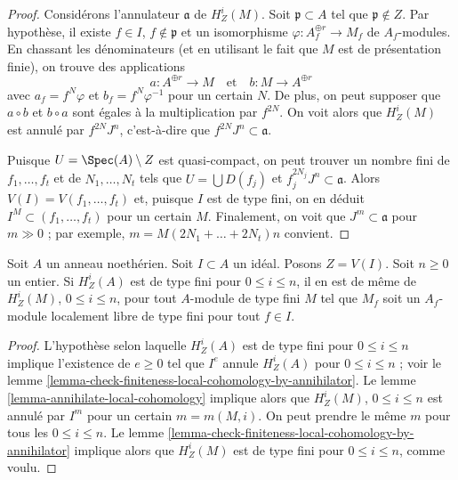 \begin{proof}
Considérons l'annulateur $\mathfrak a$ de $H^i_Z(M)$. Soit $\mathfrak p \subset A$ tel que $\mathfrak p \not \in Z$. Par hypothèse, il existe $f \in I$, $f \not \in \mathfrak p$ et un isomorphisme $\varphi : A_f^{\oplus r} \to M_f$ de $A_f$-modules. En chassant les dénominateurs (et en utilisant le fait que $M$ est de présentation finie), on trouve des applications
$$
a : A^{\oplus r} \longrightarrow M
\quad\text{et}\quad
b : M \longrightarrow A^{\oplus r}
$$
avec $a_f = f^N \varphi$ et $b_f = f^N \varphi^{-1}$ pour un certain $N$. De plus, on peut supposer que $a \circ b$ et $b \circ a$ sont égales à la multiplication par $f^{2N}$. On voit alors que $H^i_Z(M)$ est annulé par $f^{2N}J^n$, c'est-à-dire que $f^{2N}J^n \subset \mathfrak a$.

\medskip\noindent
Puisque $U = \Spec(A) \setminus Z$ est quasi-compact, on peut trouver un nombre fini de $f_1, \ldots, f_t$ et de $N_1, \ldots, N_t$ tels que $U = \bigcup D(f_j)$ et $f_j^{2N_j}J^n \subset \mathfrak a$. Alors $V(I) = V(f_1, \ldots, f_t)$ et, puisque $I$ est de type fini, on en déduit $I^M \subset (f_1, \ldots, f_t)$ pour un certain $M$. Finalement, on voit que $J^m \subset \mathfrak a$ pour $m \gg 0$ ; par exemple, $m = M (2N_1 + \ldots + 2N_t) n$ convient.
\end{proof}

\begin{lemma}
\label{lemma-local-finiteness-for-finite-locally-free}
Soit $A$ un anneau noethérien. Soit $I \subset A$ un idéal. Posons $Z = V(I)$. Soit $n \geq 0$ un entier. Si $H^i_Z(A)$ est de type fini pour $0 \leq i \leq n$, il en est de même de $H^i_Z(M)$, $0 \leq i \leq n$, pour tout $A$-module de type fini $M$ tel que $M_f$ soit un $A_f$-module localement libre de type fini pour tout $f \in I$.
\end{lemma}

\begin{proof}
L'hypothèse selon laquelle $H^i_Z(A)$ est de type fini pour $0 \leq i \leq n$ implique l'existence de $e \geq 0$ tel que $I^e$ annule $H^i_Z(A)$ pour $0 \leq i \leq n$ ; voir le lemme \ref{lemma-check-finiteness-local-cohomology-by-annihilator}. Le lemme \ref{lemma-annihilate-local-cohomology} implique alors que $H^i_Z(M)$, $0 \leq i \leq n$ est annulé par $I^m$ pour un certain $m = m(M, i)$. On peut prendre le même $m$ pour tous les $0 \leq i \leq n$. Le lemme \ref{lemma-check-finiteness-local-cohomology-by-annihilator} implique alors que $H^i_Z(M)$ est de type fini pour $0 \leq i \leq n$, comme voulu.
\end{proof}





